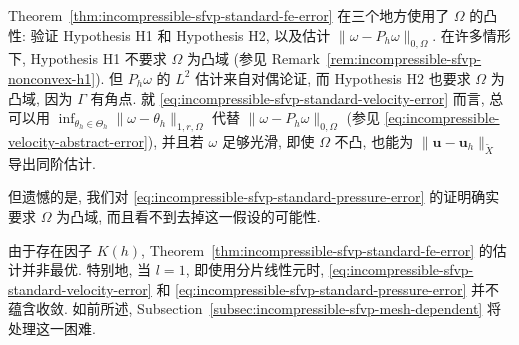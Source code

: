 \begin{Remark}\label{rem:incompressible-sfvp-convexity-and-suboptimality}
Theorem~\ref{thm:incompressible-sfvp-standard-fe-error}
在三个地方使用了 $\Omega$ 的凸性:
验证 Hypothesis H1 和 Hypothesis H2,
以及估计 $\|\omega-P_h\omega\|_{0,\Omega}$.
在许多情形下, Hypothesis H1 不要求 $\Omega$ 为凸域
(参见 Remark~\ref{rem:incompressible-sfvp-nonconvex-h1}).
但 $P_h\omega$ 的 $L^2$ 估计来自对偶论证,
而 Hypothesis H2 也要求 $\Omega$ 为凸域, 因为 $\Gamma$ 有角点.
就 \eqref{eq:incompressible-sfvp-standard-velocity-error} 而言,
总可以用
$\inf_{\theta_h\in\Theta_h}\|\omega-\theta_h\|_{1,r,\Omega}$
代替 $\|\omega-P_h\omega\|_{0,\Omega}$
(参见 \eqref{eq:incompressible-velocity-abstract-error}),
并且若 $\omega$ 足够光滑, 即使 $\Omega$ 不凸,
也能为 $\|\mathbf u-\mathbf u_h\|_{\widetilde X}$
导出同阶估计.

但遗憾的是, 我们对
\eqref{eq:incompressible-sfvp-standard-pressure-error}
的证明确实要求 $\Omega$ 为凸域, 而且看不到去掉这一假设的可能性.

由于存在因子 $K(h)$,
Theorem~\ref{thm:incompressible-sfvp-standard-fe-error}
的估计并非最优. 特别地, 当 $l=1$, 即使用分片线性元时,
\eqref{eq:incompressible-sfvp-standard-velocity-error}
和 \eqref{eq:incompressible-sfvp-standard-pressure-error}
并不蕴含收敛. 如前所述, Subsection~\ref{subsec:incompressible-sfvp-mesh-dependent}
将处理这一困难.
\end{Remark}
